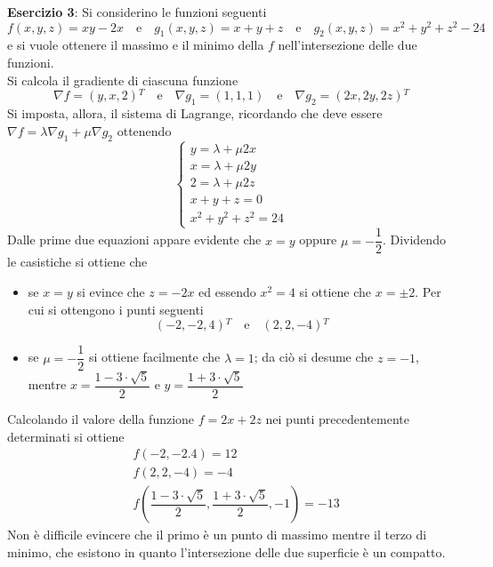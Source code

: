 \documentclass[a4paper]{extarticle}
\begin{document}
\vspace{1em}
\noindent
\textbf{Esercizio 3}: Si considerino le funzioni seguenti
\[f(x,y,z)=xy-2x \hspace{1em} \text{e} \hspace{1em} g_1(x,y,z)=x+y+z \hspace{1em} \text{e} \hspace{1em} g_2(x,y,z)=x^2+y^2+z^2-24\]
e si vuole ottenere il massimo e il minimo della $f$ nell'intersezione delle due funzioni.\\
Si calcola il gradiente di ciascuna funzione
\[\nabla f = (y,x,2){^T} \hspace{1em} \text{e} \hspace{1em} \nabla g_1=(1,1,1) \hspace{1em} \text{e} \hspace{1em} \nabla g_2 = (2x,2y,2z){^T}\]
Si imposta, allora, il sistema di Lagrange, ricordando che deve essere $\nabla f = \lambda \nabla g_1 + \mu \nabla g_2$ ottenendo
\[
    \left\{
        \begin{array}{l}
            y=\lambda + \mu 2x\\
            x=\lambda +\mu 2y\\
            2 = \lambda + \mu 2z\\
            x+y+z=0\\
            x^2+y^2+z^2=24
        \end{array}
    \right.
\]
Dalle prime due equazioni appare evidente che $x=y$ oppure $\mu=-\dfrac{1}{2}$. Dividendo le casistiche si ottiene che
\begin{itemize}
    \item se $x=y$ si evince che $z=-2x$ ed essendo $x^2=4$ si ottiene che $x=\pm 2$. Per cui si ottengono i punti seguenti
    \[(-2,-2,4){^T} \hspace{1em} \text{e} \hspace{1em} (2,2,-4){^T}\]

    \item se $\mu=-\dfrac{1}{2}$ si ottiene facilmente che $\lambda=1$; da ciò si desume che $z=-1$, mentre $x=\dfrac{1 - 3 \cdot \sqrt{5}}{2}$ e $y=\dfrac{1+3 \cdot \sqrt{5}}{2}$
\end{itemize}
Calcolando il valore della funzione $f=2x+2z$ nei punti precedentemente determinati si ottiene
\begin{align*}
    &f(-2,-2.4) = 12\\
    &f(2,2,-4) = -4\\
    &f \left(\dfrac{1-3 \cdot \sqrt{5}}{2}, \dfrac{1+3 \cdot \sqrt{5}}{2}, -1\right) = -13
\end{align*}
Non è difficile evincere che il primo è un punto di massimo mentre il terzo di minimo, che esistono in quanto l'intersezione delle due superficie è un compatto.
\end{document}

